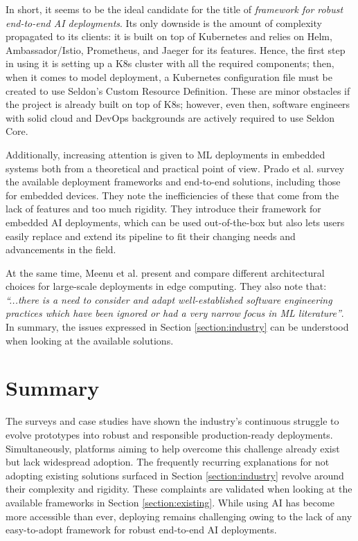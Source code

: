 In short, it seems to be the ideal candidate for the title of \textit{framework for robust end-to-end AI deployments}. Its only downside is the amount of complexity propagated to its clients: it is built on top of Kubernetes and relies on Helm, Ambassador/Istio, Prometheus, and Jaeger for its features. Hence, the first step in using it is setting up a K8s cluster with all the required components; then, when it comes to model deployment, a Kubernetes configuration file must be created to use Seldon's Custom Resource Definition. These are minor obstacles if the project is already built on top of K8s; however, even then, software engineers with solid cloud and DevOps backgrounds are actively required to use Seldon Core.

Additionally, increasing attention is given to ML deployments in embedded systems both from a theoretical \cite{john2020ai} and practical \cite{prado2020bonseyes} point of view. Prado et al. \cite{prado2020bonseyes} survey the available deployment frameworks and end-to-end solutions, including those for embedded devices. They note the inefficiencies of these that come from the lack of features and too much rigidity. They introduce their framework for embedded AI deployments, which can be used out-of-the-box but also lets users easily replace and extend its pipeline to fit their changing needs and advancements in the field. 

At the same time, Meenu et al. \cite{john2020ai} present and compare different architectural choices for large-scale deployments in edge computing. They also note that: \textit{``...there is a need to consider and adapt well-established software engineering practices which have been ignored or had a very narrow focus in ML literature''}. In summary, the issues expressed in Section \ref{section:industry} can be understood when looking at the available solutions.

\section{Summary}

The surveys and case studies have shown the industry's continuous struggle to evolve prototypes into robust and responsible production-ready deployments. Simultaneously, platforms aiming to help overcome this challenge already exist but lack widespread adoption. The frequently recurring explanations for not adopting existing solutions surfaced in Section \ref{section:industry} revolve around their complexity and rigidity. These complaints are validated when looking at the available frameworks in Section \ref{section:existing}. While using AI has become more accessible than ever, deploying remains challenging owing to the lack of any easy-to-adopt framework for robust end-to-end AI deployments.

